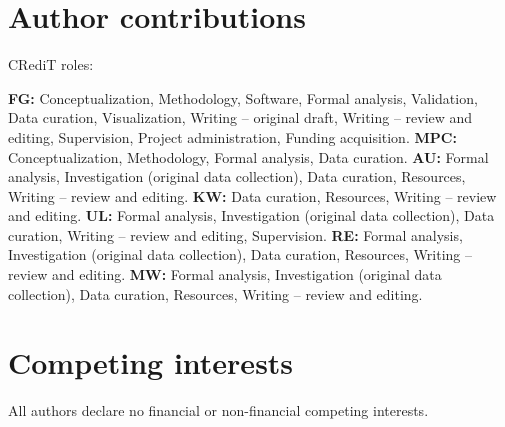 \documentclass[man,floatsintext]{apa7}
\begin{document}
\section{Author contributions}
CRediT roles:

\textbf{FG:} Conceptualization, Methodology, Software, Formal analysis, Validation, Data curation, Visualization, Writing – original draft, Writing – review and editing, Supervision, Project administration, Funding acquisition.
\textbf{MPC:} Conceptualization, Methodology, Formal analysis, Data curation.
\textbf{AU:} Formal analysis, Investigation (original data collection), Data curation, Resources, Writing – review and editing.
\textbf{KW:} Data curation, Resources, Writing – review and editing.
\textbf{UL:} Formal analysis, Investigation (original data collection), Data curation, Writing – review and editing, Supervision.
\textbf{RE:} Formal analysis, Investigation (original data collection), Data curation, Resources, Writing – review and editing. 
\textbf{MW:} Formal analysis, Investigation (original data collection), Data curation, Resources, Writing – review and editing.

\section{Competing interests}

All authors declare no financial or non-financial competing interests.

    \printbibliography
\end{document}
